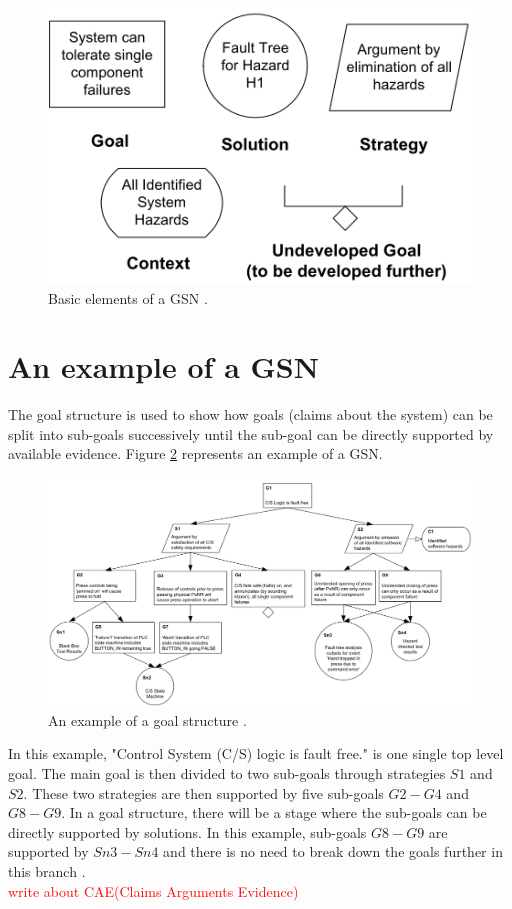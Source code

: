 \begin{figure}
    \includegraphics[width=0.5\linewidth ]{figures/gsn.png}
    \centering
    \caption{Basic elements of a GSN \cite{gsn2004Kelly}.}
    \label{fig:gsn}
\end{figure}

\section{An example of a GSN}

The goal structure is used to show how goals (claims about the system) can be split into sub-goals successively until the sub-goal can be directly supported by available evidence. Figure \ref{fig:gsn-example} represents an example of a GSN.

\begin{figure}
    \includegraphics[width=0.9\linewidth ]{figures/gsn-example.png}
    \centering
    \caption{An example of a goal structure \cite{gsn2004Kelly}.}
    \label{fig:gsn-example}
\end{figure}

In this example, "Control System (C/S) logic is fault free." is one single top level goal. The main goal is then divided to two sub-goals through strategies $S1$ and $S2$. These two strategies are then supported by five sub-goals $G2-G4$ and $G8-G9$. In a goal structure, there will be a stage where the sub-goals can be directly supported by solutions. In this example, sub-goals $G8-G9$ are supported by $Sn3-Sn4$ and there is no need to break down the goals further in this branch \cite{gsn2004Kelly}.\\
\textcolor{red}{write about CAE(Claims Arguments Evidence)}
